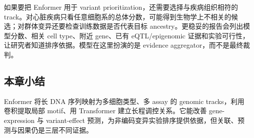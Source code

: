 如果要把 Enformer 用于 variant prioritization，还需要选择与疾病组织相符的 track。对心脏疾病只看任意细胞系的总体分数，可能得到生物学上不相关的候选；对群体变异还要检查训练数据是否代表目标 ancestry。更稳妥的报告会列出模型分数、相关 cell type、附近 gene、已有 eQTL/epigenomic 证据和实验可行性，让研究者知道排序依据。模型在这里扮演的是 evidence aggregator，而不是最终裁判。

\subsection{本章小结}

Enformer 将长 DNA 序列映射为多细胞类型、多 assay 的 genomic tracks，利用卷积提取局部 motif、用 Transformer 建立长程调控关系。它能改善 gene-expression 与 variant-effect 预测，为非编码变异实验排序提供依据，但关联、预测与因果仍是三层不同证据。

